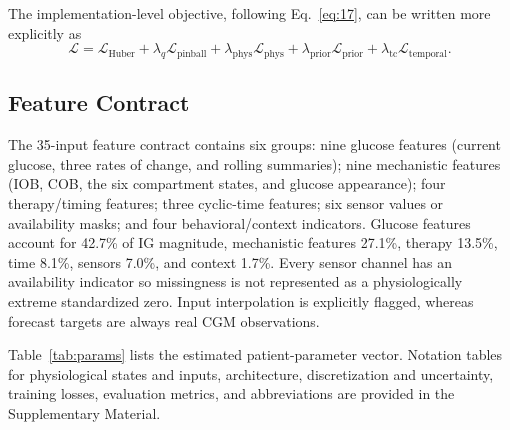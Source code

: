 \documentclass[journal]{IEEEtran}
\begin{document}
The implementation-level objective, following Eq.~\eqref{eq:17}, can be written more explicitly as
\begin{equation}
\mathcal{L} = \mathcal{L}_{\text{Huber}} + \lambda_q \mathcal{L}_{\text{pinball}} + \lambda_{\text{phys}} \mathcal{L}_{\text{phys}} + \lambda_{\text{prior}} \mathcal{L}_{\text{prior}} + \lambda_{\text{tc}} \mathcal{L}_{\text{temporal}}.
\label{eq:22}
\end{equation}

\subsection{Feature Contract}

The 35-input feature contract contains six groups: nine glucose features (current glucose, three rates of change, and rolling summaries); nine mechanistic features (IOB, COB, the six compartment states, and glucose appearance); four therapy/timing features; three cyclic-time features; six sensor values or availability masks; and four behavioral/context indicators. Glucose features account for 42.7\% of IG magnitude, mechanistic features 27.1\%, therapy 13.5\%, time 8.1\%, sensors 7.0\%, and context 1.7\%. Every sensor channel has an availability indicator so missingness is not represented as a physiologically extreme standardized zero. Input interpolation is explicitly flagged, whereas forecast targets are always real CGM observations.

Table~\ref{tab:params} lists the estimated patient-parameter vector. Notation tables for physiological states and inputs, architecture, discretization and uncertainty, training losses, evaluation metrics, and abbreviations are provided in the Supplementary Material.
\end{document}
